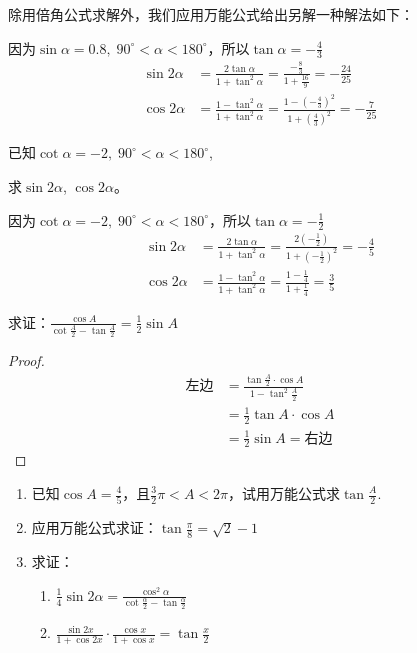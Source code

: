 \begin{solution}
   除用倍角公式求解外，我们应用万能公式给出另解一种解法如下： 

因为$\sin\alpha=0.8,\; 90^{\circ}<\alpha<180^{\circ}$，所以$\tan\alpha=-\frac{4}{3}$
\[\begin{split}
    \sin2\alpha&=\frac{2\tan\alpha}{1+\tan^2\alpha}=\frac{-\frac{8}{3}}{1+\frac{16}{9}}=-\frac{24}{25} \\
    \cos2\alpha&=\frac{1-\tan^2\alpha}{1+\tan^2\alpha}=\frac{1-\left(-\frac{4}{3}\right)^2}{1+\left(\frac{4}{3}\right)^2}=-\frac{7}{25}
\end{split}  \]
\end{solution}


\begin{example}
已知$\cot\alpha=-2,\; 90^{\circ}<\alpha<180^{\circ}$, 

求$\sin2\alpha$, $\cos2\alpha$。
\end{example}

\begin{solution}
因为$\cot\alpha=-2,\; 90^{\circ}<\alpha<180^{\circ}$，所以$\tan\alpha=-\frac{1}{2}$
\[\begin{split}
    \sin2\alpha&=\frac{2\tan\alpha}{1+\tan^2\alpha}=\frac{2\left(-\frac{1}{2}\right)}{1+\left(-\frac{1}{2}\right)^2}=-\frac{4}{5} \\
    \cos2\alpha&=\frac{1-\tan^2\alpha}{1+\tan^2\alpha}=\frac{1-\frac{1}{4}}{1+\frac{1}{4}}=\frac{3}{5}
\end{split}  \]
\end{solution}



\begin{example}
    求证：$\frac{\cos A}{\cot \frac{A}{2}-\tan \frac{A}{2}}=\frac{1}{2}\sin A$
\end{example}

\begin{proof}
\[\begin{split}
\text{左边}&=\frac{\tan \frac{A}{2}\cdot \cos A}{1-\tan^2 \frac{A}{2}}\\
&=\frac{1}{2}\tan A\cdot \cos A\\
&=\frac{1}{2}\sin A=\text{右边}
  \end{split}\]  
\end{proof}

\begin{ex}
\begin{enumerate}
    \item 已知$\cos A=\frac{4}{5}$，且$\frac{3}{2}\pi<A<2\pi$，试用万能公式求$\tan\frac{A}{2}$.
    \item 应用万能公式求证：$\tan\frac{\pi}{8}=\sqrt{2}-1$
    \item 求证：
\begin{enumerate}
    \item $\frac{1}{4}\sin2\alpha=\frac{\cos^2\alpha    }{\cot\frac{\alpha}{2}-\tan\frac{\alpha}{2}}$
    \item $\frac{\sin 2x}{1+\cos2x}\cdot \frac{\cos x}{1+\cos x}=\tan\frac{x}{2}$
\end{enumerate}
\end{enumerate}
\end{ex}


